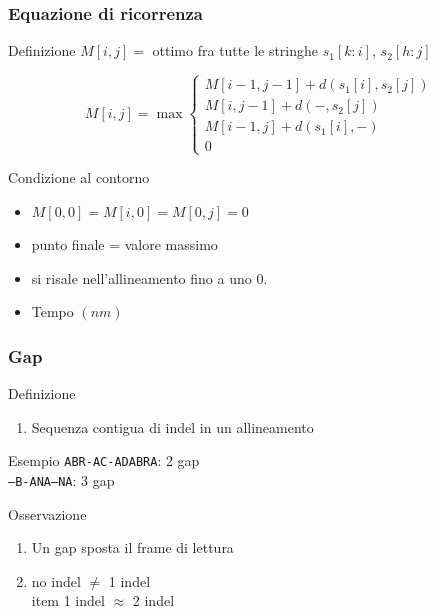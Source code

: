 \begin{frame}[fragile]
\frametitle{Equazione di ricorrenza}
\begin{block}{Definizione}
$M[i,j] = $ ottimo fra tutte le stringhe $s_{1}[k:i]$, $s_{2}[h:j]$
\end{block}
\begin{equation*}
M[i,j] = \max \left\{
\begin{array}{r}%
M[i-1, j-1] + d(s_{1}[i], s_{2}[j])\\
M[i  , j-1] + d( -     , s_{2}[j])\\
M[i-1, j  ] + d(s_{1}[i], -      )\\
0
\end{array}
\right.
\end{equation*}
\begin{block}{Condizione al contorno}
\begin{itemize}
\item
$M[0,0] = M[i,0] = M[0,j] =0$
\item
punto finale = valore massimo
\item
si risale nell'allineamento fino a uno $0$.
\item
Tempo $(nm)$
\end{itemize}
\end{block}
\end{frame}



\begin{frame}[fragile]
\frametitle{Gap}
\begin{block}{Definizione}
\begin{enumerate}
\item
Sequenza contigua di indel in un \alert{allineamento}
\end{enumerate}
\end{block}
\begin{block}{Esempio}
\texttt{ABR\alert{-}AC\alert{-}ADABRA}: 2 gap\\
\texttt{\alert{---}B\alert{-}ANA\alert{---}NA}: 3 gap
\end{block}
\begin{block}{Osservazione}
\begin{enumerate}
\item
Un gap sposta il frame di lettura
\item
no indel $\ne$ 1 indel
\\item
1 indel $\approx$ 2 indel
\end{enumerate}
\end{block}
\end{frame}

